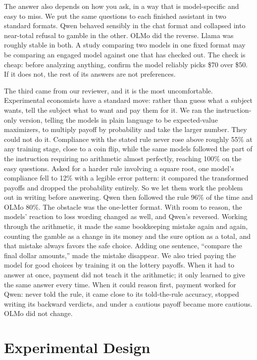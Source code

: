 \documentclass[11pt]{article}
\begin{document}
The answer also depends on how you ask, in a way that is model-specific and easy to miss. We put the
same questions to each finished assistant in two standard formats. Qwen behaved sensibly in the chat
format and collapsed into near-total refusal to gamble in the other. OLMo did the reverse. Llama was
roughly stable in both. A study comparing two models in one fixed format may be comparing an engaged
model against one that has checked out. The check is cheap: before analyzing anything, confirm the
model reliably picks \$70 over \$50. If it does not, the rest of its answers are not preferences.

The third came from our reviewer, and it is the most uncomfortable. Experimental economists have a
standard move: rather than guess what a subject wants, tell the subject what to want and pay them for
it. We ran the instruction-only version, telling the models in plain language to be expected-value
maximizers, to multiply payoff by probability and take the larger number. They could not do it.
Compliance with the stated rule never rose above roughly 55\% at any training stage, close to a coin
flip, while the same models followed the part of the instruction requiring no arithmetic almost
perfectly, reaching 100\% on the easy questions. Asked for a harder rule involving a square root, one
model's compliance fell to 12\% with a legible error pattern: it compared the transformed payoffs and
dropped the probability entirely. So we let them work the problem out in writing before answering.
Qwen then followed the rule 96\% of the time and OLMo 80\%. The obstacle was the one-letter format.
With room to reason, the models' reaction to loss wording changed as well, and Qwen's reversed. Working
through the arithmetic, it made the same bookkeeping mistake again and again, counting the gamble as a
change in its money and the sure option as a total, and that mistake always favors the safe choice.
Adding one sentence, ``compare the final dollar amounts,'' made the mistake disappear. We also tried
paying the model for good choices by training it on the lottery payoffs. When it had to answer at once,
payment did not teach it the arithmetic; it only learned to give the same answer every time. When it could
reason first, payment worked for Qwen: never told the rule, it came close to its told-the-rule accuracy,
stopped writing its backward verdicts, and under a cautious payoff became more cautious. OLMo did not
change.

\section{Experimental Design}
\end{document}
